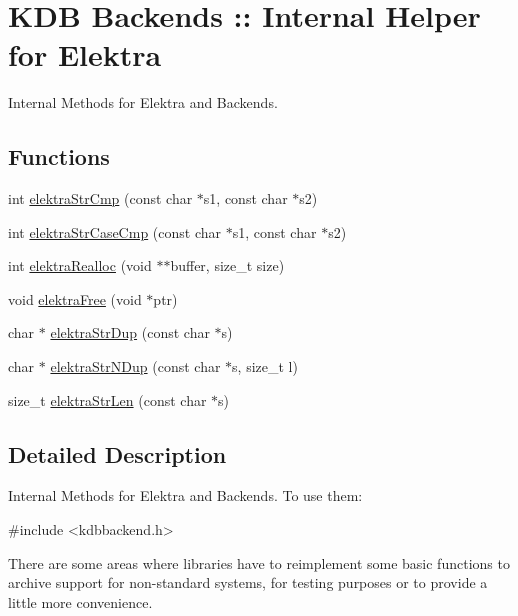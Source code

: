 \hypertarget{group__internal}{
\section{KDB Backends :: Internal Helper for Elektra}
\label{group__internal}
}


Internal Methods for Elektra and Backends.  


\subsection*{Functions}
\begin{DoxyCompactItemize}
\item 
int \hyperlink{group__internal_ga2a0aa7edaa79853ac26703f270e8f3a1}{elektraStrCmp} (const char $\ast$s1, const char $\ast$s2)
\item 
int \hyperlink{group__internal_ga686ccc3bc298a5b38c2bac0192551acd}{elektraStrCaseCmp} (const char $\ast$s1, const char $\ast$s2)
\item 
int \hyperlink{group__internal_gab0432d6765c40a5408a204c43747f4d4}{elektraRealloc} (void $\ast$$\ast$buffer, size\_\-t size)
\item 
void \hyperlink{group__internal_ga7f572149d2e0bfe18023a6ac969f195c}{elektraFree} (void $\ast$ptr)
\item 
char $\ast$ \hyperlink{group__internal_gabe50f54adaf932e177a100fe4fddad26}{elektraStrDup} (const char $\ast$s)
\item 
char $\ast$ \hyperlink{group__internal_ga04ad42d215b2ce5ed83e1a9354f6ba94}{elektraStrNDup} (const char $\ast$s, size\_\-t l)
\item 
size\_\-t \hyperlink{group__internal_gafd676487565d083a6ad5a1381095acd8}{elektraStrLen} (const char $\ast$s)
\end{DoxyCompactItemize}


\subsection{Detailed Description}
Internal Methods for Elektra and Backends. To use them: 
\begin{DoxyCode}
 #include <kdbbackend.h>
\end{DoxyCode}


There are some areas where libraries have to reimplement some basic functions to archive support for non-\/standard systems, for testing purposes or to provide a little more convenience. 

